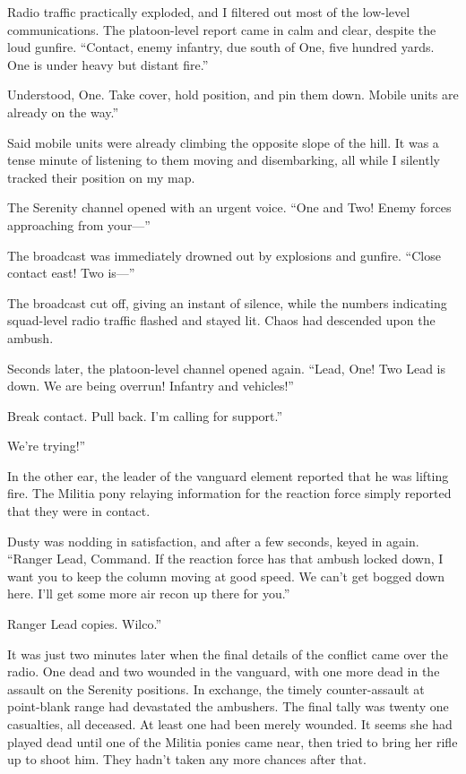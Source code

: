 Radio traffic practically exploded, and I filtered out most of the low-level communications. The platoon-level report came in calm and clear, despite the loud gunfire. “Contact, enemy infantry, due south of One, five hundred yards. One is under heavy but distant fire.”

\leavevmode{}Understood, One. Take cover, hold position, and pin them down. Mobile units are already on the way.”

Said mobile units were already climbing the opposite slope of the hill. It was a tense minute of listening to them moving and disembarking, all while I silently tracked their position on my map.

The Serenity channel opened with an urgent voice. “One and Two! Enemy forces approaching from your—”

The broadcast was immediately drowned out by explosions and gunfire. “Close contact east! Two is—”

The broadcast cut off, giving an instant of silence, while the numbers indicating squad-level radio traffic flashed and stayed lit. Chaos had descended upon the ambush.

Seconds later, the platoon-level channel opened again. “Lead, One! Two Lead is down. We are being overrun! Infantry and vehicles!”

\leavevmode{}Break contact. Pull back. I’m calling for support.”

\leavevmode{}We’re trying!”

In the other ear, the leader of the vanguard element reported that he was lifting fire. The Militia pony relaying information for the reaction force simply reported that they were in contact.

Dusty was nodding in satisfaction, and after a few seconds, keyed in again. “Ranger Lead, Command. If the reaction force has that ambush locked down, I want you to keep the column moving at good speed. We can’t get bogged down here. I’ll get some more air recon up there for you.”

\leavevmode{}Ranger Lead copies. Wilco.”

It was just two minutes later when the final details of the conflict came over the radio. One dead and two wounded in the vanguard, with one more dead in the assault on the Serenity positions. In exchange, the timely counter-assault at point-blank range had devastated the ambushers. The final tally was twenty one casualties, all deceased. At least one had been merely wounded. It seems she had played dead until one of the Militia ponies came near, then tried to bring her rifle up to shoot him. They hadn’t taken any more chances after that.

